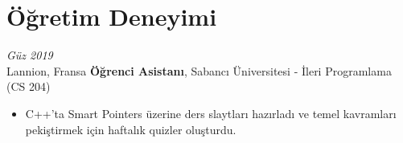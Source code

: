\section{Öğretim Deneyimi}

\begin{twocolentry}{
    \textit{Güz 2019}\\
    \small Lannion, Fransa}
    \normalsize \textbf{Öğrenci Asistanı}, \small {Sabancı Üniversitesi - İleri Programlama (CS 204)}
    \small 
    \begin{itemize}
        \item C++'ta Smart Pointers üzerine ders slaytları hazırladı ve temel kavramları pekiştirmek için haftalık quizler oluşturdu.
    \end{itemize}
    
\end{twocolentry}
